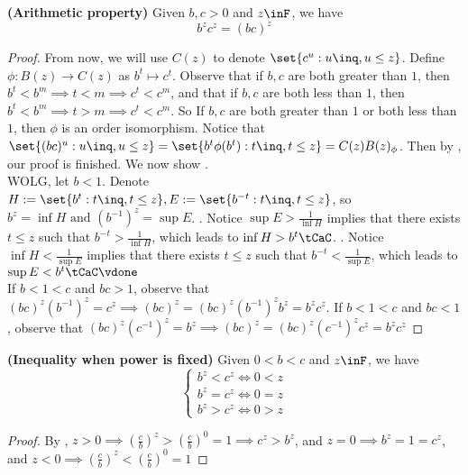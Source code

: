 \documentclass{report}
\begin{document}
\begin{theorem}
\label{1.4.9}
\textbf{(Arithmetic property)} Given $b,c>0$ and  $z\inF$, we have
\begin{equation*}
b^zc^z=(bc)^z
\end{equation*}
\end{theorem}
\begin{proof}
 From now, we will use $C(z)$ to denote $\set{c^u: u\inq, u\leq z}$. Define $\phi :B(z)\rightarrow C(z)$ as $b^t\mapsto c^t$. Observe that if $b,c$ are both greater than $1$, then  $b^t<b^m\implies t<m\implies c^t<c^m$, and that if $b,c$ are both less than $1$, then  $b^t<b^m\implies t>m\implies c^t<c^m$. So If $b,c$ are both greater than $1$ or both less than $1$,  then $\phi$ is an order isomorphism. Notice that $\set{(bc)^u:u\inq, u\leq z}=\set{b^t \phi(b^t):t\inq, t\leq z}=C(z)B(z)_\phi$. Then by , our proof is finished. We now show .\\

WOLG, let $b<1$. Denote $H:=\set{b^t:t\inq,t\leq z},E:=\set{b^{-t}:t\inq,t\leq z}$, so $b^z=\inf H\text{ and }(b^{-1})^z=\sup E$. . Notice $\sup E>\frac{1}{\inf H}$ implies that there exists $t\leq z$ such that $b^{-t}>\frac{1}{\inf H}$, which leads to $\inf H>b^t\tCaC$. . Notice $\inf H<\frac{1}{\sup E}$ implies that there exists $t\leq z$ such that $b^{-t}<\frac{1}{\sup E}$, which leads to $\sup E<b^t\tCaC\vdone$\\     

 If $b<1<c$ and $bc>1$, observe that $(bc)^z(b^{-1})^z=c^z\implies (bc)^z=(bc)^z(b^{-1})^zb^z=b^zc^z$. If $b<1<c$ and  $bc<1$, observe that $(bc)^z(c^{-1})^z=b^z\implies (bc)^z=(bc)^z(c^{-1})^zc^z=b^zc^z $  
\end{proof}
\begin{theorem}
\label{1.4.10}
\textbf{(Inequality when power is fixed)} Given $0<b<c$ and  $z\inF$, we have
\begin{equation*}
\begin{cases}
  b^z<c^z \iff 0<z\\
  b^z=c^z \iff 0=z\\
  b^z>c^z\iff 0>z
\end{cases}
\end{equation*}
\end{theorem}
\begin{proof}
By , $z>0\implies (\frac{c}{b})^z>(\frac{c}{b})^0=1\implies c^z>b^z$, and $z=0\implies b^z=1=c^z$, and $z<0\implies (\frac{c}{b})^z<(\frac{c}{b})^0=1$ 
\end{proof}
\end{document}
